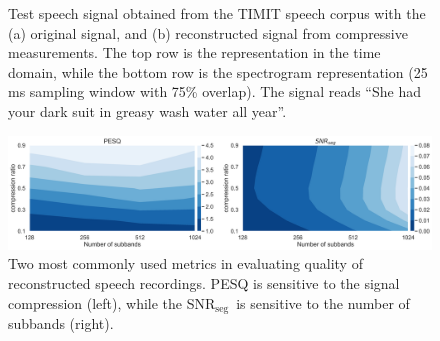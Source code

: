 \documentclass[10pt,a4paper,twoside]{article}
\newcommand{\snrseg}{SNR$_{\mathrm{seg}}$}
\begin{document}
\begin{figure}[tbp]
	\centering
	\quad %
	\caption{Test speech signal obtained from the TIMIT speech corpus with the (a) original signal, and (b) reconstructed signal from compressive measurements. The top row is the representation in the time domain, while the bottom row is the spectrogram representation (25 ms sampling window with 75\% overlap). The signal reads ``She had your dark suit in greasy wash water all year''.}\label{fig:spectrogram}
\end{figure}

\begin{figure}[tb]
	\centering
	\includegraphics[width=\textwidth]{metrics.png}
	\caption{Two most commonly used metrics in evaluating quality of reconstructed speech recordings. PESQ is sensitive to the signal compression (left), while the \snrseg~is sensitive to the number of subbands (right).}
	\label{fig:pesq-snr}
\end{figure}
\end{document}

